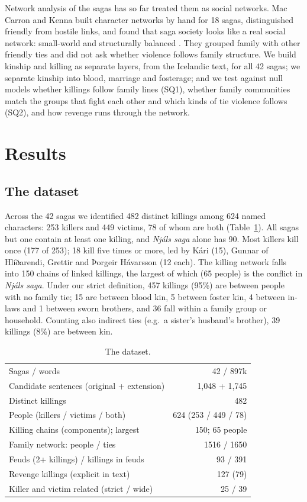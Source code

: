 \documentclass[9pt,twocolumn,twoside]{pnas-new}
\begin{document}
Network analysis of the sagas has so far treated them as social networks. Mac Carron and Kenna built character networks by hand for 18 sagas, distinguished friendly from hostile links, and found that saga society looks like a real social network: small-world and structurally balanced \cite{maccarron2013}. They grouped family with other friendly ties and did not ask whether violence follows family structure. We build kinship and killing as separate layers, from the Icelandic text, for all 42 sagas; we separate kinship into blood, marriage and fosterage; and we test against null models whether killings follow family lines (SQ1), whether family communities match the groups that fight each other and which kinds of tie violence follows (SQ2), and how revenge runs through the network.

\section*{Results}

\subsection*{The dataset}
Across the 42 sagas we identified 482 distinct killings among 624 named characters: 253 killers and 449 victims, 78 of whom are both (Table~\ref{tab:overview}). All sagas but one contain at least one killing, and \textit{Njáls saga} alone has 90. Most killers kill once (177 of 253); 18 kill five times or more, led by Kári (15), Gunnar of Hlíðarendi, Grettir and Þorgeir Hávarsson (12 each). The killing network falls into 150 chains of linked killings, the largest of which (65 people) is the conflict in \textit{Njáls saga}. Under our strict definition, 457 killings (95\%) are between people with no family tie; 15 are between blood kin, 5 between foster kin, 4 between in-laws and 1 between sworn brothers, and 36 fall within a family group or household. Counting also indirect ties (e.g.\ a sister's husband's brother), 39 killings (8\%) are between kin.

\begin{table}[tbhp]
\centering
\caption{The dataset.}
\label{tab:overview}
\begin{tabular}{lr}
\toprule
Sagas / words & 42 / 897k \\
Candidate sentences (original + extension) & 1,048 + 1,745 \\
Distinct killings & 482 \\
People (killers / victims / both) & 624 (253 / 449 / 78) \\
Killing chains (components); largest & 150; 65 people \\
Family network: people / ties & 1516 / 1650 \\
Feuds (2+ killings) / killings in feuds & 93 / 391 \\
Revenge killings (explicit in text) & 127 (79) \\
Killer and victim related (strict / wide) & 25 / 39 \\
\bottomrule
\end{tabular}
\end{table}
\end{document}
